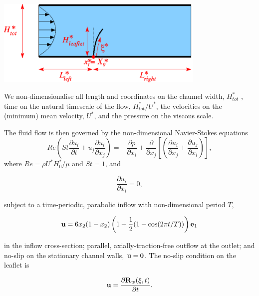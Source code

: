  
\begin{DoxyImage}
\includegraphics[width=0.75\textwidth]{fsi_channel_with_leaflet_dim}
\end{DoxyImage}


We non-\/dimensionalise all length and coordinates on the channel width, $ H^*_{tot} $ , time on the natural timescale of the flow, $ H^*_{tot}/U^* $, the velocities on the (minimum) mean velocity, $ U^* $, and the pressure on the viscous scale.

The fluid flow is then governed by the non-\/dimensional Navier-\/\+Stokes equations \[ Re \left( St \frac{\partial u_i}{\partial t} + u_j \frac{\partial u_i}{\partial x_j} \right) = - \frac{\partial p}{\partial x_i} + \frac{\partial }{\partial x_j} \left[ \left( \frac{\partial u_i}{\partial x_j} + \frac{\partial u_j}{\partial x_i} \right) \right], \] where $ Re = \rho U^* H_0^* / \mu $ and $ St = 1 $, and \begin{center} \[ \frac{\partial u_i}{\partial x_i} = 0, \] \end{center}  subject to a time-\/periodic, parabolic inflow with non-\/dimensional period $ T $, \begin{center} \[ {\bf u} = 6 x_2 (1-x_2) \left( 1 + \frac{1}{2} (1-\cos(2 \pi t/T)) \right) {\bf e}_1 \] \end{center}  in the inflow cross-\/section; parallel, axially-\/traction-\/free outflow at the outlet; and no-\/slip on the stationary channel walls, $ {\bf u} = {\bf 0} $. The no-\/slip condition on the leaflet is \begin{center} \[ {\bf u} = \frac{\partial {\bf R}_w(\xi,t)}{\partial t}. \] \end{center} 

